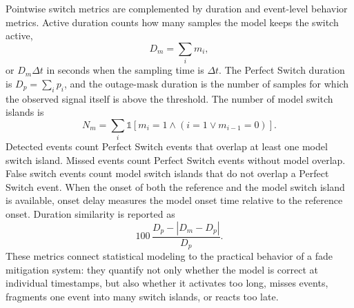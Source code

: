 Pointwise switch metrics are complemented by duration and event-level behavior
metrics. Active duration counts how many samples the model keeps the switch
active,
\[
  D_m=\sum_i m_i,
\]
or \(D_m\Delta t\) in seconds when the sampling time is \(\Delta t\). The
Perfect Switch duration is \(D_p=\sum_i p_i\), and the outage-mask duration is
the number of samples for which the observed signal itself is above the
threshold. The number of model switch islands is
\[
  N_m =
  \sum_i
  \mathbb{1}\left[m_i=1 \land (i=1 \lor m_{i-1}=0)\right].
\]
Detected events count Perfect Switch events that overlap at least one model
switch island. Missed events count Perfect Switch events without model overlap.
False switch events count model switch islands that do not overlap a Perfect
Switch event. When the onset of both the reference and the model switch island
is available, onset delay measures the model onset time relative to the
reference onset. Duration similarity is reported as
\[
  100\,\frac{D_p-|D_m-D_p|}{D_p}.
\]
These metrics connect statistical modeling to the practical behavior of a
fade mitigation system: they quantify not only whether the model is correct at
individual timestamps, but also whether it activates too long, misses events,
fragments one event into many switch islands, or reacts too late.
